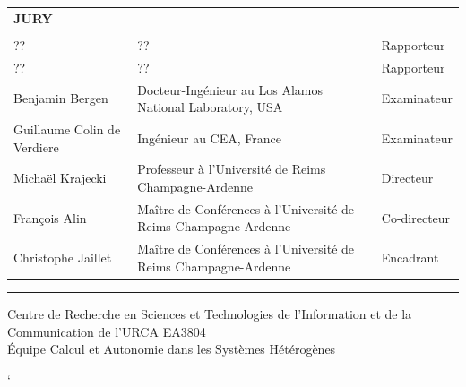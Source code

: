 \documentclass[11pt,a4paper]{book}
\begin{document}
{{\normalsize
\begin{tabular}{l l l}
\textbf{JURY} &  & \\
&&\\
?? & ?? & Rapporteur\\
?? & ?? & Rapporteur\\
Benjamin Bergen & Docteur-Ingénieur au Los Alamos National Laboratory, USA & Examinateur \\
Guillaume Colin de Verdiere & Ingénieur au CEA, France & Examinateur\\
Michaël Krajecki & Professeur à l'Université de Reims Champagne-Ardenne & Directeur \\
François Alin & Maître de Conférences à l'Université de Reims Champagne-Ardenne & Co-directeur  \\
Christophe Jaillet & Maître de Conférences à l'Université de Reims Champagne-Ardenne & Encadrant \\

\end{tabular}

\vspace{0.5cm}

\hrule

\vspace{0.5cm}

Centre de Recherche en Sciences et Technologies de l'Information et de la Communication de l'URCA EA3804\\ 
\'Equipe Calcul et Autonomie dans les Systèmes Hétérogènes

}

}%
\clearpage 
{}
\thispagestyle{empty}

\frontmatter





\tableofcontents

\listoffigures

\listoftables

\mainmatter






`


\printindex


\nocite{*}

\end{document}
